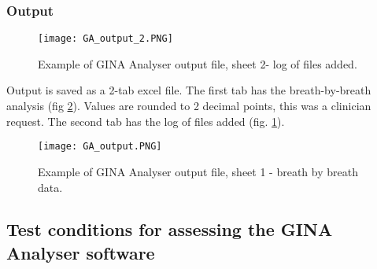 \documentclass[12pt, openany, oneside]{book}
\begin{document}
\newpage
\subsubsection{Output}
\begin{figure}[H]
\texttt{[image: GA\_output\_2.PNG]}
		
		\caption[GINA Analyser output file, data log]{Example of GINA Analyser output file, sheet 2- log of files added.}
		\label{fig:out2}
\end{figure}

Output is saved as a 2-tab excel file. The first tab has the breath-by-breath analysis (fig \ref{fig:out1}). Values are rounded to 2 decimal points, this was a clinician request. The second tab has the log of files added (fig. \ref{fig:out2}).

\begin{landscape}
\begin{figure}
		\texttt{[image: GA\_output.PNG]}		
		\caption[GINA Analyser output file, breath by breath data]{Example of GINA Analyser output file, sheet 1 - breath by breath data.}
		\label{fig:out1}
\end{figure}
\end{landscape}



\subsection{Test conditions for assessing the GINA Analyser software}
\end{document}

